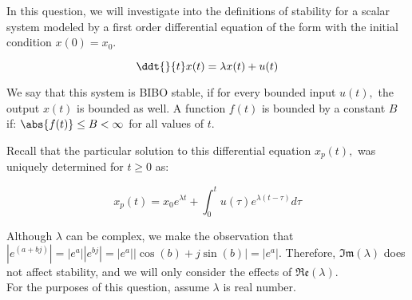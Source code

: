 

In this question, we will investigate into the definitions of stability for a scalar system modeled by a first order differential equation of the form with the initial condition $x(0) = x_{0}.$ 

\begin{equation} \label{eq:h}
\ddt{}{t} x(t) = \lambda x(t) + u(t)
\end{equation}

We say that this system is BIBO stable, if for every bounded input $u(t),$ the output $x(t)$ is bounded as well. \vskip 1pt
A function $f(t)$ is bounded by a constant $B$ if: $\abs{f(t)} \leq B < \infty$ for all values of $t.$

Recall that the particular solution to this differential equation $x_{p}(t),$ was uniquely determined for $t \geq 0$ as:

\begin{equation} \label{eq:h}
x_{p}(t) = x_{0} e^{\lambda t} + \int_{0}^{t} u(\tau) e^{\lambda(t - \tau)} d\tau
\end{equation}

Although $\lambda$ can be complex, we make the observation that $|e^{(a + bj)}| = |e^{a}| |e^{bj}| = |e^{a}| |\cos(b) + j \sin(b)| = |e^{a}|.$
Therefore, $\mathfrak{Im}(\lambda)$ does not affect stability, and we will only consider the effects of $\mathfrak{Re}(\lambda).$  \\
For the purposes of this question, assume $\lambda$ is real number. 

